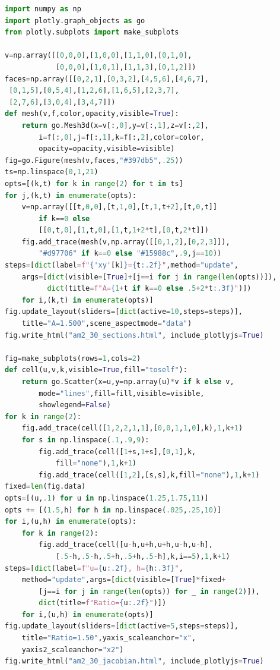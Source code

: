 \begin{lstlisting}[language=Python]
import numpy as np
import plotly.graph_objects as go
from plotly.subplots import make_subplots

v=np.array([[0,0,0],[1,0,0],[1,1,0],[0,1,0],
            [0,0,0],[1,0,1],[1,1,3],[0,1,2]])
faces=np.array([[0,2,1],[0,3,2],[4,5,6],[4,6,7],
 [0,1,5],[0,5,4],[1,2,6],[1,6,5],[2,3,7],
 [2,7,6],[3,0,4],[3,4,7]])
def mesh(v,f,color,opacity,visible=True):
    return go.Mesh3d(x=v[:,0],y=v[:,1],z=v[:,2],
        i=f[:,0],j=f[:,1],k=f[:,2],color=color,
        opacity=opacity,visible=visible)
fig=go.Figure(mesh(v,faces,"#397db5",.25))
ts=np.linspace(0,1,21)
opts=[(k,t) for k in range(2) for t in ts]
for j,(k,t) in enumerate(opts):
    v=np.array([[t,0,0],[t,1,0],[t,1,t+2],[t,0,t]]
        if k==0 else
        [[0,t,0],[1,t,0],[1,t,1+2*t],[0,t,2*t]])
    fig.add_trace(mesh(v,np.array([[0,1,2],[0,2,3]]),
        "#d97706" if k==0 else "#15988c",.9,j==10))
steps=[dict(label=f"{'xy'[k]}={t:.2f}",method="update",
    args=[dict(visible=[True]+[j==i for j in range(len(opts))]),
          dict(title=f"A={1+t if k==0 else .5+2*t:.3f}")])
    for i,(k,t) in enumerate(opts)]
fig.update_layout(sliders=[dict(active=10,steps=steps)],
    title="A=1.500",scene_aspectmode="data")
fig.write_html("am2_30_sections.html", include_plotlyjs=True)

fig=make_subplots(rows=1,cols=2)
def cell(u,v,k,visible=True,fill="toself"):
    return go.Scatter(x=u,y=np.array(u)*v if k else v,
        mode="lines",fill=fill,visible=visible,
        showlegend=False)
for k in range(2):
    fig.add_trace(cell([1,2,2,1,1],[0,0,1,1,0],k),1,k+1)
    for s in np.linspace(.1,.9,9):
        fig.add_trace(cell([1+s,1+s],[0,1],k,
            fill="none"),1,k+1)
        fig.add_trace(cell([1,2],[s,s],k,fill="none"),1,k+1)
fixed=len(fig.data)
opts=[(u,.1) for u in np.linspace(1.25,1.75,11)]
opts += [(1.5,h) for h in np.linspace(.025,.25,10)]
for i,(u,h) in enumerate(opts):
    for k in range(2):
        fig.add_trace(cell([u-h,u+h,u+h,u-h,u-h],
            [.5-h,.5-h,.5+h,.5+h,.5-h],k,i==5),1,k+1)
steps=[dict(label=f"u={u:.2f}, h={h:.3f}",
    method="update",args=[dict(visible=[True]*fixed+
        [j==i for j in range(len(opts)) for _ in range(2)]),
        dict(title=f"Ratio={u:.2f}")])
    for i,(u,h) in enumerate(opts)]
fig.update_layout(sliders=[dict(active=5,steps=steps)],
    title="Ratio=1.50",yaxis_scaleanchor="x",
    yaxis2_scaleanchor="x2")
fig.write_html("am2_30_jacobian.html", include_plotlyjs=True)
\end{lstlisting}

